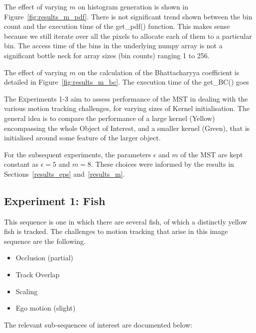 The effect of varying $m$ on histogram generation is shown in
Figure~\ref{fig:results_m_pdf}. There is not significant trend shown between the
bin count and the execution time of the get\_pdf() function. This makes sense
because we still iterate over all the pixels to allocate each of them to a
particular bin. The access time of the bins in the underlying numpy array is not
a significant bottle neck for array sizes (bin counts) ranging 1 to 256.

The effect of varying $m$ on the calculation of the Bhattacharyya coefficient is
detailed in Figure~\ref{fig:results_m_bc}. The execution time of the get\_BC() goes  




The Experiments 1-3 aim to assess performance of the MST in dealing with the
various motion tracking challenges, for varying sizes of Kernel initialisation.
The general idea is to compare the performance of a large kernel (Yellow)
encompassing the whole Object of Interest, and a smaller kernel (Green), that is
initialised around some feature of the larger object. 

For the subsequent experiments, the parameters $\epsilon$ and $m$ of the MST are
kept constant as $\epsilon=5$ and $m=8$. These choices were informed by the results in
Sections~\ref{results_eps} and~\ref{results_m}. 

\subsection{Experiment 1: Fish}
This sequence is one in which there are several fish, of which a distinctly yellow fish is
tracked. The challenges to motion tracking that arise in this image sequence are the following.
\begin{itemize}
    \item Occlusion (partial)
    \item Track Overlap
    \item Scaling 
    \item Ego motion (slight) 
\end{itemize}

The relevant sub-sequences of interest are documented below:

